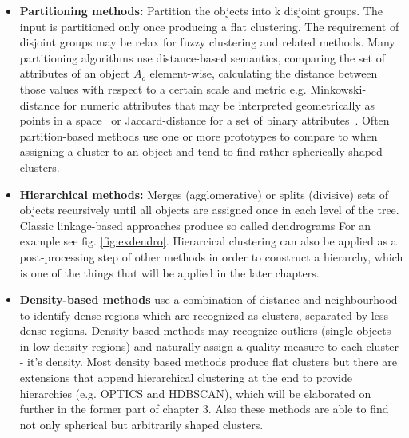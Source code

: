 \begin{itemize}
    \item \textbf{Partitioning methods:} Partition the objects into k disjoint groups. The input is partitioned only once producing a flat clustering. The requirement of disjoint groups may be relax for fuzzy clustering and related methods. Many partitioning algorithms use distance-based semantics, comparing the set of attributes of an object $A_{o}$ element-wise, calculating the distance between those values with respect to a certain scale and metric e.g. Minkowski-distance for numeric attributes that may be interpreted geometrically as points in a space~\cite{THEODORIDIS2009701} or Jaccard-distance for a set of binary attributes~\cite{DBLP:journals/corr/Kosub16}. Often partition-based methods use one or more prototypes to compare to when assigning a cluster to an object and tend to find rather spherically shaped clusters. \\
    
    \item \textbf{Hierarchical methods:} Merges (agglomerative) or splits (divisive) sets of objects recursively until all objects are assigned once in each level of the tree. Classic linkage-based approaches produce so called dendrograms  For an example see fig. \ref{fig:exdendro}. Hierarcical clustering can also be applied as a post-processing step of other methods in order to construct a hierarchy, which is one of the things that will be applied in the later chapters. \\
    
    \item \textbf{Density-based methods} use a combination of distance and neighbourhood to identify dense regions which are recognized as clusters, separated by less dense regions. Density-based methods may recognize outliers (single objects in low density regions) and naturally assign a quality measure to each cluster - it's density. Most density based methods produce flat clusters but there are extensions that append hierarchical clustering at the end to provide hierarchies (e.g. OPTICS and HDBSCAN), which will be elaborated on further in the former part of chapter 3. Also these methods are able to find not only spherical but arbitrarily shaped clusters.  \\
    

\end{itemize}
